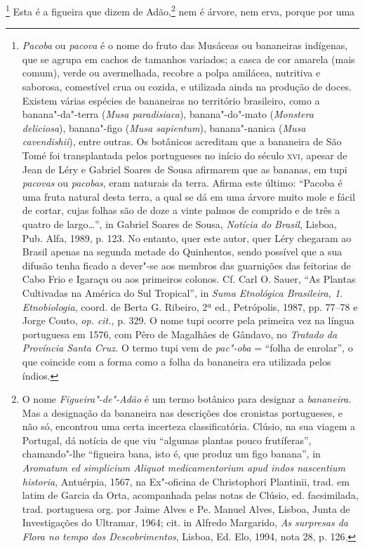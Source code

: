 \footnote{ \textit{Pacoba} ou \textit{pacova} é o
nome do fruto das Musáceas ou bananeiras indígenas, que se agrupa em
cachos de tamanhos variados; a casca de cor amarela (mais comum), verde
ou avermelhada, recobre a polpa amilácea, nutritiva e saborosa,
comestível crua ou cozida, e utilizada ainda na produção de doces.
Existem várias espécies de bananeiras no território brasileiro, como a
banana"-da"-terra (\textit{Musa paradisiaca}), banana"-do"-mato
(\textit{Monstera deliciosa}), banana"-figo (\textit{Musa sapientum}), 
banana"-nanica (\textit{Musa cavendishii}), entre outras. Os botânicos
acreditam que a bananeira de São Tomé foi transplantada pelos
portugueses no início do século \textsc{xvi}, apesar de Jean de Léry e Gabriel
Soares de Sousa afirmarem que as bananas, em tupi \textit{pacovas} ou
\textit{pacobas}, eram naturais da terra. Afirma este último: ``Pacoba é
uma fruta natural desta terra, a qual se dá em uma árvore muito mole e
fácil de cortar, cujas folhas são de doze a vinte palmos de comprido e
de três a quatro de largo\ldots'', in Gabriel Soares de Sousa,
\textit{Notícia do Brasil}, Lisboa, Pub. Alfa, 1989, p. 123. No
entanto, quer este autor, quer Léry chegaram ao Brasil apenas na
segunda metade do Quinhentos, sendo possível que a sua difusão tenha
ficado a dever"-se aos membros das guarnições das feitorias de Cabo Frio
e Igaraçu ou aos primeiros colonos. Cf. Carl O. Sauer, ``As Plantas
Cultivadas na América do Sul Tropical'', in \textit{Suma Etnológica
Brasileira, 1. Etnobiologia}, coord. de Berta G. Ribeiro, 2ª ed.,
Petrópolis, 1987, pp. 77--78 e Jorge Couto, \textit{op. cit.}, p. 329. O
nome tupi ocorre pela primeira vez na língua portuguesa em 1576, com
Pêro de Magalhães de Gândavo, no \textit{Tratado da Província Santa Cruz.}
O termo tupi vem de \textit{pac"-oba} = ``folha de enrolar'', o que
coincide com a forma como a folha da bananeira era utilizada pelos
índios.} Esta é a figueira que dizem de Adão,\footnote{ O
nome \textit{Figueira"-de"-Adão} é um termo botânico para designar a
\textit{bananeira.} Mas a designação da bananeira nas descrições dos
cronistas portugueses, e não só, encontrou uma certa incerteza
classificatória. Clúsio, na sua viagem a Portugal, dá notícia de que
viu ``algumas plantas pouco frutíferas'', chamando"-lhe ``figueira bana,
isto é, que produz um figo banana'', in \textit{Aromatum ed simplicium
Aliquot medicamentorium apud indos nascentium historia}, Antuérpia,
1567, na Ex"-oficina de Christophori Plantinii, trad. em latim de Garcia
da Orta, acompanhada pelas notas de Clúsio, ed. facsimilada, trad.
portuguesa org. por Jaime Alves e Pe. Manuel Alves, Lisboa, Junta de
Investigações do Ultramar, 1964; cit. in Alfredo Margarido, \textit{As
surpresas da Flora no tempo dos Descobrimentos}, Lisboa, Ed. Elo, 1994,
nota 28, p. 126.} nem é árvore, nem erva, porque por uma

